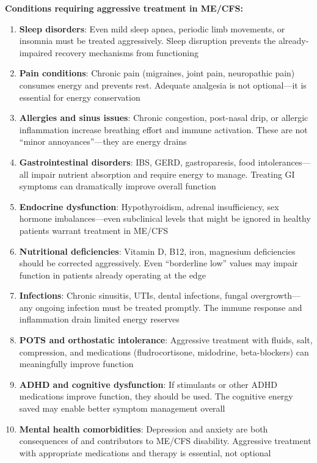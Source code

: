 \textbf{Conditions requiring aggressive treatment in ME/CFS:}

\begin{enumerate}
    \item \textbf{Sleep disorders}: Even mild sleep apnea, periodic limb movements, or insomnia must be treated aggressively. Sleep disruption prevents the already-impaired recovery mechanisms from functioning

    \item \textbf{Pain conditions}: Chronic pain (migraines, joint pain, neuropathic pain) consumes energy and prevents rest. Adequate analgesia is not optional---it is essential for energy conservation

    \item \textbf{Allergies and sinus issues}: Chronic congestion, post-nasal drip, or allergic inflammation increase breathing effort and immune activation. These are not ``minor annoyances''---they are energy drains

    \item \textbf{Gastrointestinal disorders}: IBS, GERD, gastroparesis, food intolerances---all impair nutrient absorption and require energy to manage. Treating GI symptoms can dramatically improve overall function

    \item \textbf{Endocrine dysfunction}: Hypothyroidism, adrenal insufficiency, sex hormone imbalances---even subclinical levels that might be ignored in healthy patients warrant treatment in ME/CFS

    \item \textbf{Nutritional deficiencies}: Vitamin D, B12, iron, magnesium deficiencies should be corrected aggressively. Even ``borderline low'' values may impair function in patients already operating at the edge

    \item \textbf{Infections}: Chronic sinusitis, UTIs, dental infections, fungal overgrowth---any ongoing infection must be treated promptly. The immune response and inflammation drain limited energy reserves

    \item \textbf{POTS and orthostatic intolerance}: Aggressive treatment with fluids, salt, compression, and medications (fludrocortisone, midodrine, beta-blockers) can meaningfully improve function

    \item \textbf{ADHD and cognitive dysfunction}: If stimulants or other ADHD medications improve function, they should be used. The cognitive energy saved may enable better symptom management overall

    \item \textbf{Mental health comorbidities}: Depression and anxiety are both consequences of and contributors to ME/CFS disability. Aggressive treatment with appropriate medications and therapy is essential, not optional
\end{enumerate}


